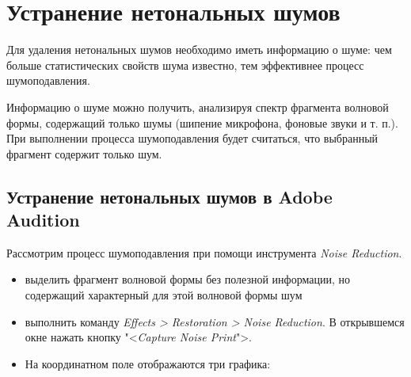 \documentclass{beamer}
\begin{document}
\section{Устранение нетональных шумов}
\begin{frame}
Для удаления нетональных шумов необходимо иметь информацию о шуме: чем больше статистических свойств шума известно, тем эффективнее процесс шумоподавления.

Информацию о шуме можно получить, анализируя спектр фрагмента волновой формы, содержащий только шумы (шипение микрофона, фоновые звуки и т. п.). При выполнении процесса шумоподавления будет считаться, что выбранный фрагмент содержит только шум.

\end{frame}

\subsection{Устранение нетональных шумов в Adobe Audition}
\begin{frame}
Рассмотрим процесс шумоподавления при помощи инструмента \textit{Noise Reduction}.
\begin{itemize}
    \item выделить фрагмент волновой формы без полезной информации, но содержащий характерный для этой волновой формы шум
    \item выполнить команду \textit{Effects > Restoration > Noise Reduction}. В открывшемся окне нажать кнопку "<\emph{Capture Noise Print}">. 
    \item На координатном поле отображаются три графика:        
\end{itemize}
\end{frame}
\end{document}
